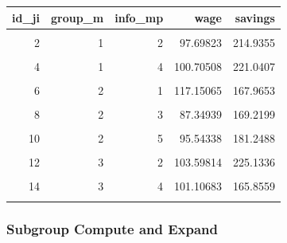 \documentclass[
]{book}
\begin{document}
\begin{table}[!h]
\centering
\begin{tabular}{r|r|r|r|r}
\hline
id\_ji & group\_m & info\_mp & wage & savings\\
\hline
\cellcolor{gray!6}{1} & \cellcolor{gray!6}{1} & \cellcolor{gray!6}{1} & \cellcolor{gray!6}{94.39524} & \cellcolor{gray!6}{253.6074}\\
\hline
2 & 1 & 2 & 97.69823 & 214.9355\\
\hline
\cellcolor{gray!6}{3} & \cellcolor{gray!6}{1} & \cellcolor{gray!6}{3} & \cellcolor{gray!6}{115.58708} & \cellcolor{gray!6}{141.0015}\\
\hline
4 & 1 & 4 & 100.70508 & 221.0407\\
\hline
\cellcolor{gray!6}{5} & \cellcolor{gray!6}{1} & \cellcolor{gray!6}{5} & \cellcolor{gray!6}{101.29288} & \cellcolor{gray!6}{185.8163}\\
\hline
6 & 2 & 1 & 117.15065 & 167.9653\\
\hline
\cellcolor{gray!6}{7} & \cellcolor{gray!6}{2} & \cellcolor{gray!6}{2} & \cellcolor{gray!6}{104.60916} & \cellcolor{gray!6}{193.4608}\\
\hline
8 & 2 & 3 & 87.34939 & 169.2199\\
\hline
\cellcolor{gray!6}{9} & \cellcolor{gray!6}{2} & \cellcolor{gray!6}{4} & \cellcolor{gray!6}{93.13147} & \cellcolor{gray!6}{178.1333}\\
\hline
10 & 2 & 5 & 95.54338 & 181.2488\\
\hline
\cellcolor{gray!6}{11} & \cellcolor{gray!6}{3} & \cellcolor{gray!6}{1} & \cellcolor{gray!6}{112.24082} & \cellcolor{gray!6}{149.3992}\\
\hline
12 & 3 & 2 & 103.59814 & 225.1336\\
\hline
\cellcolor{gray!6}{13} & \cellcolor{gray!6}{3} & \cellcolor{gray!6}{3} & \cellcolor{gray!6}{104.00771} & \cellcolor{gray!6}{204.6012}\\
\hline
14 & 3 & 4 & 101.10683 & 165.8559\\
\hline
\cellcolor{gray!6}{15} & \cellcolor{gray!6}{3} & \cellcolor{gray!6}{5} & \cellcolor{gray!6}{94.44159} & \cellcolor{gray!6}{237.6144}\\
\hline
\end{tabular}
\end{table}

\hypertarget{subgroup-compute-and-expand}{%
\subsubsection{Subgroup Compute and Expand}\label{subgroup-compute-and-expand}}
\end{document}
